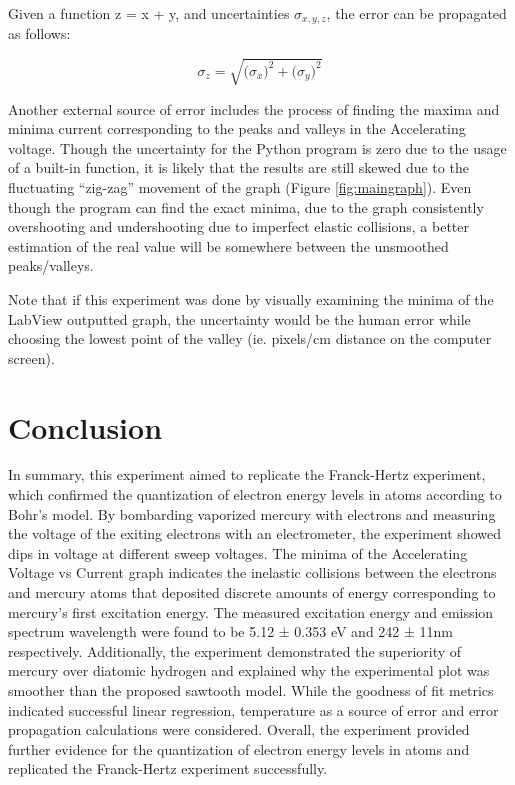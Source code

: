 \documentclass[12pt, letterpaper, twoside]{article}
\begin{document}
Given a function z = x + y, and uncertainties $\sigma_{x,y,z}$, the error can be propagated as follows:

\begin{equation}
    \sigma_z = \sqrt{\big(\sigma_x\big)^2 + \big(\sigma_y\big)^2} \label{eqn:uncertainty}
\end{equation}

Another external source of error includes the process of finding the maxima and minima current corresponding to the peaks and valleys in the Accelerating voltage. Though the uncertainty for the Python program is zero due to the usage of a built-in function, it is likely that the results are still skewed due to the fluctuating “zig-zag” movement of the graph (Figure \ref{fig:maingraph}). Even though the program can find the exact minima, due to the graph consistently overshooting and undershooting due to imperfect elastic collisions, a better estimation of the real value will be somewhere between the unsmoothed peaks/valleys.

Note that if this experiment was done by visually examining the minima of the LabView outputted graph, the uncertainty would be the human error while choosing the lowest point of the valley (ie. pixels/cm distance on the computer screen).



\section{Conclusion}

In summary, this experiment aimed to replicate the Franck-Hertz experiment, which confirmed the quantization of electron energy levels in atoms according to Bohr's model. By bombarding vaporized mercury with electrons and measuring the voltage of the exiting electrons with an electrometer, the experiment showed dips in voltage at different sweep voltages. The minima of the Accelerating Voltage vs Current graph indicates the inelastic collisions between the electrons and mercury atoms that deposited discrete amounts of energy corresponding to mercury's first excitation energy. The measured excitation energy and emission spectrum wavelength were found to be 5.12 ± 0.353 eV and 242 ± 11nm respectively. Additionally, the experiment demonstrated the superiority of mercury over diatomic hydrogen and explained why the experimental plot was smoother than the proposed sawtooth model. While the goodness of fit metrics indicated successful linear regression, temperature as a source of error and error propagation calculations were considered. Overall, the experiment provided further evidence for the quantization of electron energy levels in atoms and replicated the Franck-Hertz experiment successfully.
\end{document}
